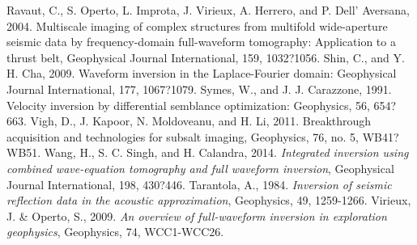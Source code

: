 \documentclass[mreferee]{gji}
\begin{document}
\begin{thebibliography}{}
 Ravaut, C., S. Operto, L. Improta, J. Virieux, A. Herrero, and P. Dell' Aversana, 2004. Multiscale imaging of complex structures from multifold wide-aperture seismic data by frequency-domain full-waveform tomography: Application to a thrust belt, Geophysical Journal International, 159, 1032?1056.
 Shin, C., and Y. H. Cha, 2009. Waveform inversion in the Laplace-Fourier domain: Geophysical Journal International, 177, 1067?1079.
 Symes, W., and J. J. Carazzone, 1991. Velocity inversion by differential semblance optimization: Geophysics, 56, 654?663.
 Vigh, D., J. Kapoor, N. Moldoveanu, and H. Li, 2011. Breakthrough acquisition and technologies for subsalt imaging, Geophysics, 76, no. 5, WB41?WB51.
 Wang, H., S. C. Singh, and H. Calandra, 2014. \textit{Integrated inversion using combined wave-equation tomography and full waveform inversion}, Geophysical Journal International, 198, 430?446.
   Tarantola, A., 1984. \textit{Inversion of seismic reflection data in the acoustic approximation}, Geophysics, 49, 1259-1266.
    Virieux, J. \& Operto, S., 2009. \textit{An overview of full-waveform inversion in exploration geophysics}, Geophysics, 74, WCC1-WCC26.

\end{thebibliography}
\end{document}
